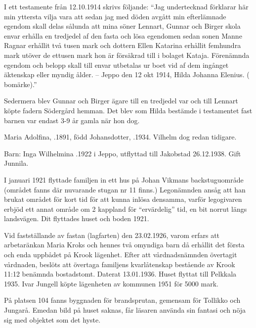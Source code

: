 I ett testamente från 12.10.1914 skrivs följande: ``Jag undertecknad förklarar här min yttersta vilja vara att sedan jag 	med döden avgått min efterlämnade egendom skall delas sålunda att mina söner Lennart, Gunnar och Birger skola envar erhålla en tredjedel af den fasta och lösa egendomen sedan sonen Manne Ragnar erhållit två tusen mark och dottern Ellen Katarina erhållit femhundra mark utöver de ettusen mark hon är försäkrad till i bolaget Kataja. Förenämnda egendom och belopp skall till envar utbetalas ur boet vid af dem ingånget äktenskap eller myndig ålder. -- Jeppo den 12 okt 1914, Hilda Johanna Elenius. ( bomärke).''

Sedermera blev Gunnar och Birger ägare till en tredjedel var och till Lennart köpte fadern Södergård hemman. Det blev som Hilda bestämde i testamentet fast barnen var endast 3-9 år gamla när hon dog.






Maria Adolfina, .1891, född Johansdotter, .1934.	Vilhelm dog redan tidigare.

Barn: Inga Wilhelmina .1922 i Jeppo, utflyttad till Jakobstad 26.12.1938. Gift Junnila.

I januari 1921 flyttade familjen in ett hus på Johan Vikmans backstuguområde (området fanns där nuvarande stugan nr 11 	finns.) Legonämnden ansåg att han brukat området för kort tid för att kunna inlösa densamma, varför legogivaren erbjöd ett annat område om 2 kappland för ``ervärdelig'' tid, en bit norrut längs landsvägen. Dit flyttades huset och boden 1921.

Vid fastställande av fastan (lagfarten) den 23.02.1926, varom erfars att arbetaränkan Maria Kroks och hennes två omyndiga barn då erhållit det första och enda uppbådet på Krook lägenhet. Efter att vårdnadsnämnden övertagit vårdnaden, beslöts att övertaga familjens kvarlåtenskap bestående av Krook 11:12 benämnda bostadstomt. Daterat 13.01.1936. Huset flyttat till Pelkkala 1935. Ivar Jungell köpte lägenheten av kommunen 1951 för 5000 mark.



På platsen 104 fanns byggnaden för brandsprutan, gemensam för Tollikko och Jungarå. Emedan bild på huset saknas, får läsaren använda sin fantasi och nöja sig med objektet som det hyste.




